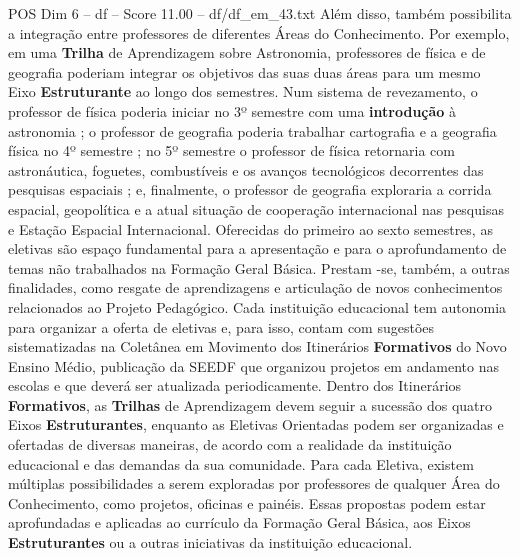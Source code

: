 \begin{textsample}{POS Dim 6 – df – Score 11.00 – df/df\_em\_43.txt}
Além disso, também possibilita a integração entre professores de diferentes Áreas do Conhecimento.
Por exemplo, em uma \textbf{Trilha} de Aprendizagem sobre Astronomia, professores de física e de geografia poderiam integrar os objetivos das suas duas áreas para um mesmo Eixo \textbf{Estruturante} ao longo dos semestres.
Num sistema de revezamento, o professor de física poderia iniciar no 3º semestre com uma \textbf{introdução} à astronomia ; o professor de geografia poderia trabalhar cartografia e a geografia física no 4º semestre ; no 5º semestre o professor de física retornaria com astronáutica, foguetes, combustíveis e os avanços tecnológicos decorrentes das pesquisas espaciais ; e, finalmente, o professor de geografia exploraria a corrida espacial, geopolítica e a atual situação de cooperação internacional nas pesquisas e Estação Espacial Internacional.
Oferecidas do primeiro ao sexto semestres, as eletivas são espaço fundamental para a apresentação e para o aprofundamento de temas não trabalhados na Formação Geral Básica.
Prestam -se, também, a outras finalidades, como resgate de aprendizagens e articulação de novos conhecimentos relacionados ao Projeto Pedagógico.
Cada instituição educacional tem autonomia para organizar a oferta de eletivas e, para isso, contam com sugestões sistematizadas na Coletânea em Movimento dos Itinerários \textbf{Formativos} do Novo Ensino Médio, publicação da SEEDF que organizou projetos em andamento nas escolas e que deverá ser atualizada periodicamente.
Dentro dos Itinerários \textbf{Formativos}, as \textbf{Trilhas} de Aprendizagem devem seguir a sucessão dos quatro Eixos \textbf{Estruturantes}, enquanto as Eletivas Orientadas podem ser organizadas e ofertadas de diversas maneiras, de acordo com a realidade da instituição educacional e das demandas da sua comunidade.
Para cada Eletiva, existem múltiplas possibilidades a serem exploradas por professores de qualquer Área do Conhecimento, como projetos, oficinas e painéis.
Essas propostas podem estar aprofundadas e aplicadas ao currículo da Formação Geral Básica, aos Eixos \textbf{Estruturantes} ou a outras iniciativas da instituição educacional.

\end{textsample}
